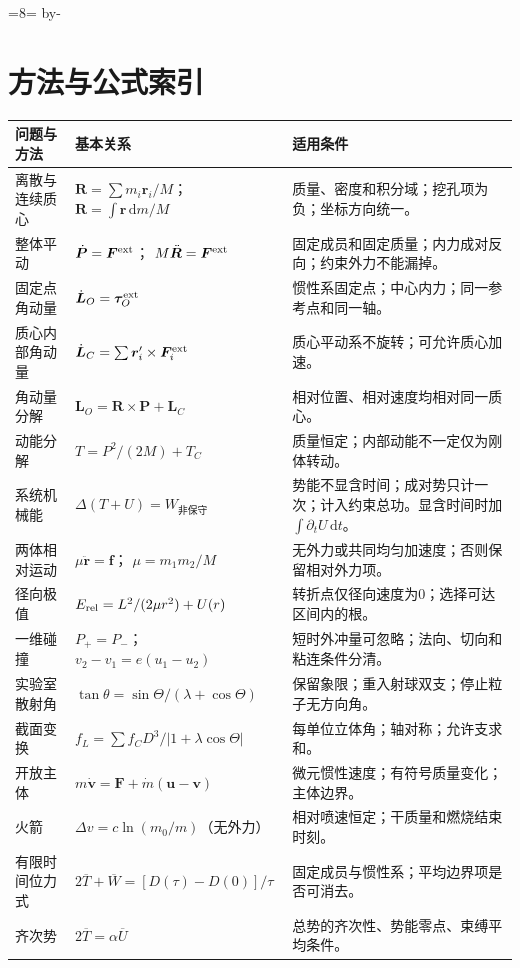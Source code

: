 \documentclass[UTF8,zihao=-4,fontset=fandol,a4paper]{ctexart}
\makeatletter
\newcommand{\vect}[1]{\bm{#1}}
\newcommand{\dd}{\mathrm d}
\newcommand{\Needspace}[1]{\par\if@nobreak\else\penalty0\begingroup\dimen0=#1\relax\dimen2=\pagegoal\advance\dimen2 by-\pagetotal\ifdim\dimen0>\dimen2\newpage\fi\endgroup\fi}
\let\SavedSection\section
\renewcommand{\section}{\Needspace{8\baselineskip}\SavedSection}
\makeatother
\begin{document}
\section*{方法与公式索引}
\begin{small}
\begin{longtable}{p{2.6cm}p{6.7cm}p{5.4cm}}
\toprule
问题与方法 & 基本关系 & 适用条件\\
\midrule\endhead
离散与连续质心 &
$\vect R=\sum m_i\vect r_i/M$；
$\vect R=\int\vect r\,\dd m/M$ &
质量、密度和积分域；挖孔项为负；坐标方向统一。\\
整体平动 &
$\dot{\vect P}=\vect F^{\rm ext}$；
$M\ddot{\vect R}=\vect F^{\rm ext}$ &
固定成员和固定质量；内力成对反向；约束外力不能漏掉。\\
固定点角动量 &
$\dot{\vect L}_O=\vect\tau_O^{\rm ext}$ &
惯性系固定点；中心内力；同一参考点和同一轴。\\
质心内部角动量 &
$\dot{\vect L}_C=\sum\vect r'_i\times\vect F_i^{\rm ext}$ &
质心平动系不旋转；可允许质心加速。\\
角动量分解 &
$\vect L_O=\vect R\times\vect P+\vect L_C$ &
相对位置、相对速度均相对同一质心。\\
动能分解 &
$T=P^2/(2M)+T_C$ &
质量恒定；内部动能不一定仅为刚体转动。\\
系统机械能 &
$\Delta(T+U)=W_{\text{非保守}}$ &
势能不显含时间；成对势只计一次；计入约束总功。显含时间时加 $\int\partial_tU\,\dd t$。\\
两体相对运动 &
$\mu\ddot{\vect r}=\vect f$；
$\mu=m_1m_2/M$ &
无外力或共同均匀加速度；否则保留相对外力项。\\
径向极值 &
$E_{\rm rel}=L^2/(2\mu r^2)+U(r)$ &
转折点仅径向速度为0；选择可达区间内的根。\\
一维碰撞 &
$P_+=P_-$；
$v_2-v_1=e(u_1-u_2)$ &
短时外冲量可忽略；法向、切向和粘连条件分清。\\
实验室散射角 &
$\tan\theta=\sin\Theta/(\lambda+\cos\Theta)$ &
保留象限；重入射球双支；停止粒子无方向角。\\
截面变换 &
$f_L=\sum f_CD^3/|1+\lambda\cos\Theta|$ &
每单位立体角；轴对称；允许支求和。\\
开放主体 &
$m\dot{\vect v}=\vect F+\dot m(\vect u-\vect v)$ &
微元惯性速度；有符号质量变化；主体边界。\\
火箭 &
$\Delta v=c\ln(m_0/m)$（无外力） &
相对喷速恒定；干质量和燃烧结束时刻。\\
有限时间位力式 &
$2\overline T+\overline W=[D(\tau)-D(0)]/\tau$ &
固定成员与惯性系；平均边界项是否可消去。\\
齐次势 &
$2\overline T=\alpha\overline U$ &
总势的齐次性、势能零点、束缚平均条件。\\
\bottomrule
\end{longtable}
\end{small}
\clearpage
\clearpage
\end{document}
